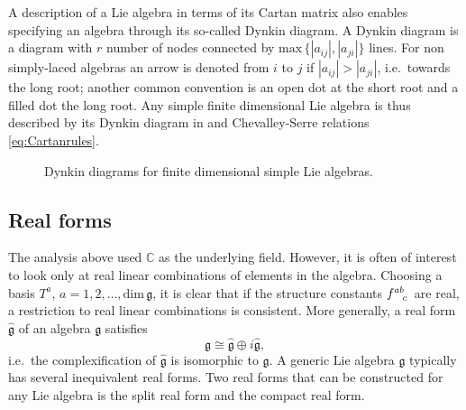 A description of a Lie algebra in terms of its Cartan matrix also enables specifying an algebra through its so-called Dynkin diagram. A Dynkin diagram is a diagram with $r$ number of nodes connected by $\text{max}\,\{|a_{ij}|,|a_{ji}|\}$ lines. For non simply-laced algebras an arrow is denoted from $i$ to $j$ if $|a_{ij}|>|a_{ji}|$, i.e.\ towards the long root; another common convention is an open dot at the short root and a filled dot the long root. Any simple finite dimensional Lie algebra is thus described by its Dynkin diagram in  and Chevalley-Serre relations \eqref{eq:Cartanrules}.
\begin{figure}
    \centering
    \AllDynkin
    \caption{Dynkin diagrams for finite dimensional simple Lie algebras.}
    \label{fig:AllDynkin}
\end{figure}



\subsection{Real forms}\label{sec:Realforms}
The analysis above used $\mathbb{C}$ as the underlying field. However, it is often of interest to look only at real linear combinations of elements in the algebra. Choosing a basis $T^a$, $a=1,2,\ldots, \text{dim}\,\mathfrak{g}$, it is clear that if the structure constants $\tensor{f}{^{ab}_c}$ are real, a restriction to real linear combinations is consistent. More generally, a real form $\hat{\mathfrak{g}}$ of an algebra $\mathfrak{g}$ satisfies
\begin{equation}
    \mathfrak{g} \cong \hat{\mathfrak{g}}\oplus i\hat{\mathfrak{g}},
\end{equation}
i.e.\ the complexification of $\hat{\mathfrak{g}}$ is isomorphic to $\mathfrak{g}$. A generic Lie algebra $\mathfrak{g}$ typically has several inequivalent real forms. Two real forms that can be constructed for any Lie algebra is the split real form and the compact real form.

